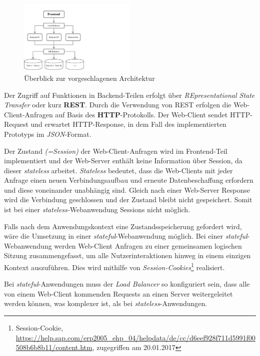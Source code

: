 \begin{figure}[H]
\centering
\includegraphics[trim = 0mm 0mm 0mm 0mm, clip, width=0.5\textwidth]{resources/ueberblickArchitektur}
\caption[Überblick zur vorgeschlagenen Architektur]{Überblick zur vorgeschlagenen Architektur}
\label{img:ueberblickArchitektur}
\end{figure}


Der Zugriff auf Funktionen in Backend-Teilen erfolgt über \textit{REpresentational State Transfer} oder kurz \textbf{REST}. Durch die Verwendung von REST erfolgen die Web-Client-Anfragen auf Basis des \textbf{HTTP}-Protokolls. Der Web-Client sendet HTTP-Request und erwartet HTTP-Response, in dem Fall des implementierten Prototyps im \textit{JSON}-Format.

Der Zustand \textit{(=Session)} der Web-Client-Anfragen wird im Frontend-Teil implementiert und der Web-Server enthält keine Information über Session, da dieser \textit{stateless} arbeitet. \textit{Stateless} bedeutet, dass die Web-Clients mit jeder Anfrage einen neuen Verbindungsaufbau und erneute Datenbeschaffung erfordern und diese voneinander unabhängig sind. Gleich nach einer Web-Server Response wird die Verbindung geschlossen und der Zustand bleibt nicht gespeichert. Somit ist bei einer \textit{stateless-}Webanwendung Sessions nicht möglich.

Falls nach dem Anwendungskontext eine Zustandsspeicherung gefordert wird, wäre die Umsetzung in einer \textit{stateful}-Webanwendung möglich. Bei einer \textit{stateful}-Webanwendung werden Web-Client Anfragen zu einer gemeinsamen logischen Sitzung zusammengefasst, um alle Nutzerinteraktionen hinweg in einem einzigen Kontext auszuführen. Dies wird mithilfe von \textit{Session-Cookies}\footnote{Session-Cookie, \url{https://help.sap.com/erp2005_ehp_04/helpdata/de/cc/d6eef928f711d5991f00508b6b8b11/content.htm}, zugegriffen am 20.01.2017} realisiert.

Bei \textit{stateful}-Anwendungen muss der \textit{Load Balancer} so konfiguriert sein, dass alle von einem Web-Client kommenden Requests an einen Server weitergeleitet werden können, was komplexer ist, als bei \textit{stateless}-Anwendungen. 

